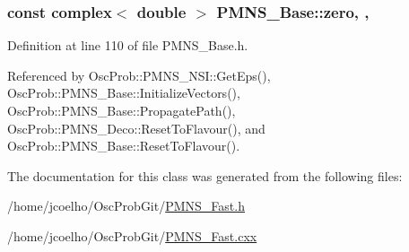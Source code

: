 \subsubsection[{\texorpdfstring{zero}{zero}}]{\setlength{\rightskip}{0pt plus 5cm}const {\bf complex}$<$ double $>$ P\+M\+N\+S\+\_\+\+Base\+::zero\hspace{0.3cm}{\ttfamily [static]}, {\ttfamily [protected]}, {\ttfamily [inherited]}}\hypertarget{classOscProb_1_1PMNS__Base_a5c31ed4593cf95feb36fb80c1850d25e}{}\label{classOscProb_1_1PMNS__Base_a5c31ed4593cf95feb36fb80c1850d25e}


Definition at line 110 of file P\+M\+N\+S\+\_\+\+Base.\+h.



Referenced by Osc\+Prob\+::\+P\+M\+N\+S\+\_\+\+N\+S\+I\+::\+Get\+Eps(), Osc\+Prob\+::\+P\+M\+N\+S\+\_\+\+Base\+::\+Initialize\+Vectors(), Osc\+Prob\+::\+P\+M\+N\+S\+\_\+\+Base\+::\+Propagate\+Path(), Osc\+Prob\+::\+P\+M\+N\+S\+\_\+\+Deco\+::\+Reset\+To\+Flavour(), and Osc\+Prob\+::\+P\+M\+N\+S\+\_\+\+Base\+::\+Reset\+To\+Flavour().



The documentation for this class was generated from the following files\+:\begin{DoxyCompactItemize}
\item 
/home/jcoelho/\+Osc\+Prob\+Git/\hyperlink{PMNS__Fast_8h}{P\+M\+N\+S\+\_\+\+Fast.\+h}\item 
/home/jcoelho/\+Osc\+Prob\+Git/\hyperlink{PMNS__Fast_8cxx}{P\+M\+N\+S\+\_\+\+Fast.\+cxx}\end{DoxyCompactItemize}
